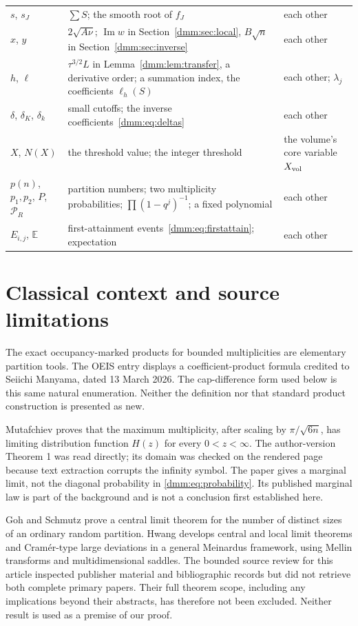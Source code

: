 \documentclass[11pt,letterpaper]{article}
\numberwithin{equation}{section}
\theoremstyle{definition}\newtheorem{definition}[theorem]{Definition}
\theoremstyle{remark}\newtheorem{remark}[theorem]{Remark}
\newcommand{\E}{\mathbb E}
\DeclareMathOperator{\Ima}{Im}
\begin{document}
\begin{longtable}{@{}>{\raggedright\arraybackslash}p{0.95in}>{\raggedright\arraybackslash}p{3.45in}>{\raggedright\arraybackslash}p{1.7in}@{}}
$s$, $s_J$ & $\sum S$; the smooth root of $f_J$ & each other\\
$x$, $y$ & $2\sqrt{A\nu}$; $\Ima w$ in Section~\ref{dmm:sec:local}, $B\sqrt n$ in Section~\ref{dmm:sec:inverse} & each other\\
$h$, $\ell$ & $\tau^{3/2}L$ in Lemma~\ref{dmm:lem:transfer}, a derivative order; a summation index, the coefficients $\ell_h(S)$ & each other; $\lambda_j$\\
$\delta$, $\delta_K$, $\delta_k$ & small cutoffs; the inverse coefficients~\eqref{dmm:eq:deltas} & each other\\
$X$, $N(X)$ & the threshold value; the integer threshold & the volume's core variable $X_{\rm vol}$\\
$p(n)$, $p_1,p_2$, $P$, $\mathcal P_R$ & partition numbers; two multiplicity probabilities; $\prod(1-q^j)^{-1}$; a fixed polynomial & each other\\
$E_{i,j}$, $\E$ & first-attainment events~\eqref{dmm:eq:firstattain}; expectation & each other\\
\bottomrule
\end{longtable}
\endgroup

\section{Classical context and source limitations}\label{dmm:sec:prior}
The exact occupancy-marked products for bounded multiplicities are elementary partition tools. The OEIS entry \cite{oeis} displays a coefficient-product formula credited to Seiichi Manyama, dated 13 March 2026. The cap-difference form used below is this same natural enumeration. Neither the definition nor that standard product construction is presented as new.

Mutafchiev \cite{mutafchiev} proves that the maximum multiplicity, after scaling by $\pi/\sqrt{6n}$, has limiting distribution function $H(z)$ for every $0<z<\infty$. The author-version Theorem 1 was read directly; its domain was checked on the rendered page because text extraction corrupts the infinity symbol. The paper gives a marginal limit, not the diagonal probability in \eqref{dmm:eq:probability}. Its published marginal law is part of the background and is not a conclusion first established here.

Goh and Schmutz \cite{goh} prove a central limit theorem for the number of distinct sizes of an ordinary random partition. Hwang \cite{hwang} develops central and local limit theorems and Cram\'er-type large deviations in a general Meinardus framework, using Mellin transforms and multidimensional saddles. The bounded source review for this article inspected publisher material and bibliographic records but did not retrieve both complete primary papers. Their full theorem scope, including any implications beyond their abstracts, has therefore not been excluded. Neither result is used as a premise of our proof.
\end{document}
